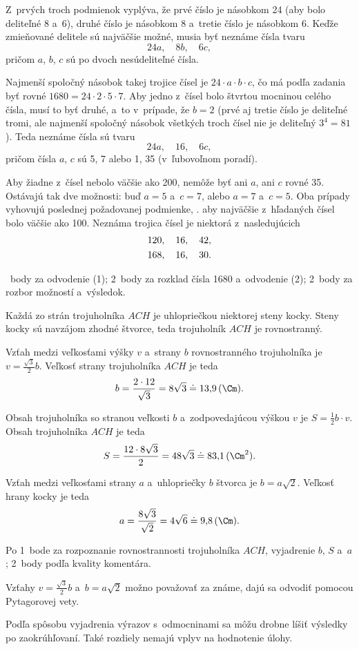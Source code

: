 {%
Z~prvých troch podmienok vyplýva, že prvé číslo je násobkom 24 (aby bolo deliteľné 8 a~6), druhé číslo je násobkom 8 a~tretie číslo je násobkom 6.
Keďže zmieňované delitele sú najväčšie možné, musia byť neznáme čísla tvaru
$$
24a,\quad 8b,\quad 6c,
\tag{1}
$$
pričom $a$, $b$, $c$ sú po dvoch nesúdeliteľné čísla.

Najmenší spoločný násobok takej trojice čísel je $24\cdot a\cdot b\cdot c$, čo má podľa zadania byť rovné $1680=24\cdot 2\cdot5\cdot7$.
Aby jedno z~čísel bolo štvrtou mocninou celého čísla,
musí to byť druhé, a~to v~prípade, že $b=2$
(prvé aj tretie číslo je deliteľné tromi, ale najmenší spoločný násobok všetkých troch čísel nie je deliteľný $3^4=81$).
Teda neznáme čísla sú tvaru
$$
24a,\quad 16,\quad 6c,
\tag{2}
$$
pričom čísla $a$, $c$ sú 5, 7 alebo 1, 35 (v~ľubovoľnom poradí).

Aby žiadne z~čísel nebolo väčšie ako 200, nemôže byť ani $a$, ani $c$ rovné 35.
Ostávajú tak dve možnosti: buď $a=5$ a~$c=7$, alebo $a=7$ a~$c=5$.
Oba prípady vyhovujú poslednej požadovanej podmienke, \tj. aby najväčšie z~hľadaných čísel bolo väčšie ako 100.
Neznáma trojica čísel je niektorá z~nasledujúcich
$$
\gathered
120,\quad 16,\quad 42, \\
168,\quad 16,\quad 30.
\endgathered
$$

~body za odvodenie (1);
2~body za rozklad čísla 1680 a~odvodenie (2);
2~body za rozbor možností a~výsledok.
\endhodnotenie
}

{%
Každá zo strán trojuholníka $ACH$ je uhlopriečkou niektorej steny kocky.
Steny kocky sú navzájom zhodné štvorce, teda trojuholník $ACH$ je rovnostranný.

Vzťah medzi veľkosťami výšky $v$ a~strany $b$ rovnostranného trojuholníka je $v=\frac{\sqrt{3}}{2}b$.
Veľkosť strany trojuholníka $ACH$ je teda
$$
b =\frac{2\cdot12}{\sqrt{3}} =8\sqrt{3} \doteq 13{,}9\,(\Cm).
$$

Obsah trojuholníka so stranou veľkosti $b$ a~zodpovedajúcou výškou $v$ je $S=\frac12 b\cdot v$.
Obsah trojuholníka $ACH$ je teda
$$
S =\frac{12\cdot 8\sqrt3}{2} =48\sqrt3 \doteq 83{,}1\,(\Cm^2).
$$

Vzťah medzi veľkosťami strany $a$ a~uhlopriečky $b$ štvorca je $b=a\sqrt2$.
Veľkosť hrany kocky je teda
$$
a =\frac{8\sqrt3}{\sqrt2} =4\sqrt6 \doteq 9{,}8\,(\Cm).
$$

\hodnotenie
Po 1~bode za rozpoznanie rovnostrannosti trojuholníka $ACH$, vyjadrenie $b$, $S$ a~$a$;
2~body podľa kvality komentára.

\poznamky
Vzťahy $v=\frac{\sqrt{3}}{2}b$ a~$b=a\sqrt2$ možno považovať za známe, dajú sa odvodiť pomocou Pytagorovej vety.

Podľa spôsobu vyjadrenia výrazov s~odmocninami sa môžu drobne líšiť výsledky po zaokrúhľovaní.
Také rozdiely nemajú vplyv na hodnotenie úlohy.
\endhodnotenie
}

